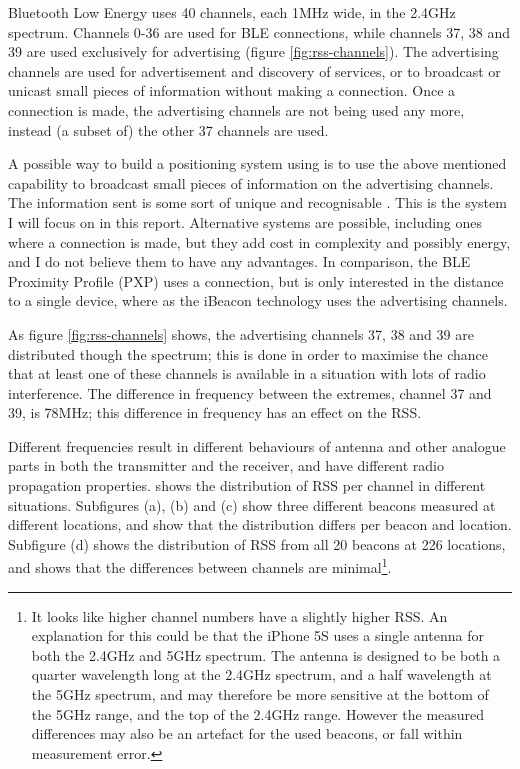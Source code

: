 Bluetooth Low Energy uses 40 channels, each 1MHz wide, in the 2.4GHz spectrum\citep{bluetooth40spec}.
Channels 0-36 are used for BLE connections, while channels 37, 38 and 39 are used exclusively for advertising (figure \ref{fig:rss-channels}).
The advertising channels are used for advertisement and discovery of services, or to broadcast or unicast small pieces of information without making a connection.
Once a connection is made, the advertising channels are not being used any more, instead (a subset of) the other 37 channels are used.

A possible way to build a positioning system using \BLE is to use the above mentioned capability to broadcast small pieces of information on the advertising channels.
The information sent is some sort of unique and recognisable \bid.
This is the system I will focus on in this report.
Alternative systems are possible, including ones where a connection is made, but they add cost in complexity and possibly energy, and I do not believe them to have any advantages.
In comparison, the BLE Proximity Profile (PXP) uses a connection, but is only interested in the distance to a single device, where as the iBeacon technology uses the advertising channels.

As figure \ref{fig:rss-channels} shows, the advertising channels 37, 38 and 39 are distributed though the spectrum; this is done in order to maximise the chance that at least one of these channels is available in a situation with lots of radio interference.
The difference in frequency between the extremes, channel 37 and 39, is 78MHz; this difference in frequency has an effect on the RSS.

Different frequencies result in different behaviours of antenna and other analogue parts in both the transmitter and the receiver, and have different radio propagation properties.
 shows the distribution of RSS per channel in different situations.
Subfigures (a), (b) and (c) show three different beacons measured at different locations, and show that the distribution differs per beacon and location.
Subfigure (d) shows the distribution of RSS from all 20 beacons at 226 locations, and shows that the differences between channels are minimal\footnote{It looks like higher channel numbers have a slightly higher RSS.
    An explanation for this could be that the iPhone 5S uses a single antenna for both the 2.4GHz and 5GHz spectrum.
    The antenna is designed to be both a quarter wavelength long at the 2.4GHz spectrum, and a half wavelength at the 5GHz spectrum, and may therefore be more sensitive at the bottom of the 5GHz range, and the top of the 2.4GHz range.
    However the measured differences may also be an artefact for the used beacons, or fall within measurement error.
}.

